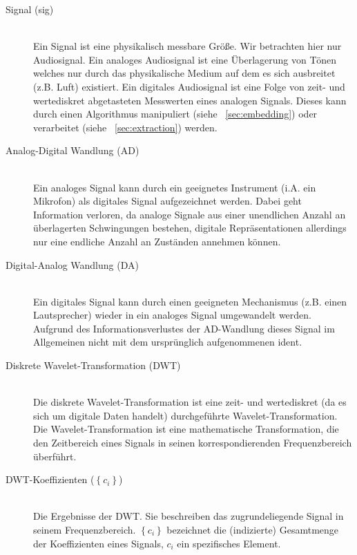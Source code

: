 \begin{description}

\item[Signal (sig)] \hfill \\
Ein Signal ist eine physikalisch messbare Gr\"o{\ss}e. Wir betrachten hier nur Audiosignal. Ein analoges Audiosignal ist eine \"Uberlagerung von T\"onen welches nur durch das physikalische Medium auf dem es sich ausbreitet (z.B. Luft) existiert. Ein digitales Audiosignal ist eine Folge von zeit- und wertediskret abgetasteten Messwerten eines analogen Signals. Dieses kann durch einen Algorithmus manipuliert (siehe ~\ref{sec:embedding}) oder verarbeitet (siehe ~\ref{sec:extraction}) werden.

\item[Analog-Digital Wandlung (AD)] \hfill \\  
Ein analoges Signal kann durch ein geeignetes Instrument (i.A. ein Mikrofon) als digitales Signal aufgezeichnet werden. Dabei geht Information verloren, da analoge Signale aus einer unendlichen Anzahl an \"uberlagerten Schwingungen bestehen, digitale Repr\"asentationen allerdings nur eine endliche Anzahl an Zust\"anden annehmen k\"onnen. 

\item[Digital-Analog Wandlung (DA)] \hfill \\  
Ein digitales Signal kann durch einen geeigneten Mechanismus (z.B. einen Lautsprecher) wieder in ein analoges Signal umgewandelt werden. Aufgrund des Informationsverlustes der AD-Wandlung dieses Signal im Allgemeinen nicht mit dem urspr\"unglich aufgenommenen ident. 

\item[Diskrete Wavelet-Transformation (DWT)] \hfill \\ 
Die diskrete Wavelet-Transformation ist eine zeit- und wertediskret (da es sich um digitale Daten handelt) durchgef\"uhrte Wavelet-\-Trans\-formation. Die Wavelet-Transformation ist eine mathematische Transformation, die den Zeitbereich eines Signals in seinen korrespondierenden Frequenzbereich \"uberf\"uhrt. 
	 	 
\item[DWT-Koeffizienten ($\left\{{c}_{i}\right\}$)] \hfill \\ 
Die Ergebnisse der DWT. Sie beschreiben das zugrundeliegende Signal in seinem Frequenzbereich. $\left\{{c}_{i}\right\}$ bezeichnet die (indizierte) Gesamtmenge der Koeffizienten eines Signals, $c_i$ ein spezifisches Element. 


\end{description}
